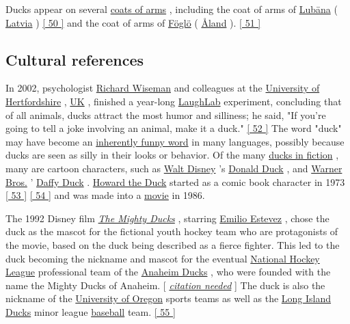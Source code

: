 \documentclass[11pt,a4paper]{article}
\begin{document}
Ducks appear on several \href{/wiki/Coats\_of\_arms}{coats of arms} , including the coat of arms of \href{/wiki/Lub\%C4\%81na}{Lubāna} ( \href{/wiki/Latvia}{Latvia} ) \href{\#cite\_note-50}{[ 50 ]} and the coat of arms of \href{/wiki/F\%C3\%B6gl\%C3\%B6}{Föglö} ( \href{/wiki/\%C3\%85land}{Åland} ). \href{\#cite\_note-51}{[ 51 ]}

\subsection{Cultural references}

In 2002, psychologist \href{/wiki/Richard\_Wiseman}{Richard Wiseman} and colleagues at the \href{/wiki/University\_of\_Hertfordshire}{University of Hertfordshire} , \href{/wiki/UK}{UK} , finished a year-long \href{/wiki/LaughLab}{LaughLab} experiment, concluding that of all animals, ducks attract the most humor and silliness; he said, "If you're going to tell a joke involving an animal, make it a duck." \href{\#cite\_note-52}{[ 52 ]} The word "duck" may have become an \href{/wiki/Inherently\_funny\_word}{inherently funny word} in many languages, possibly because ducks are seen as silly in their looks or behavior. Of the many \href{/wiki/List\_of\_fictional\_ducks}{ducks in fiction} , many are cartoon characters, such as \href{/wiki/The\_Walt\_Disney\_Company}{Walt Disney} 's \href{/wiki/Donald\_Duck}{Donald Duck} , and \href{/wiki/Warner\_Bros.}{Warner Bros.} ' \href{/wiki/Daffy\_Duck}{Daffy Duck} . \href{/wiki/Howard\_the\_Duck}{Howard the Duck} started as a comic book character in 1973 \href{\#cite\_note-53}{[ 53 ]} \href{\#cite\_note-54}{[ 54 ]} and was made into a \href{/wiki/Howard\_the\_Duck\_\%28film\%29}{movie} in 1986.

The 1992 Disney film \href{/wiki/The\_Mighty\_Ducks\_\%28film\%29}{\textit{The Mighty Ducks}} , starring \href{/wiki/Emilio\_Estevez}{Emilio Estevez} , chose the duck as the mascot for the fictional youth hockey team who are protagonists of the movie, based on the duck being described as a fierce fighter. This led to the duck becoming the nickname and mascot for the eventual \href{/wiki/National\_Hockey\_League}{National Hockey League} professional team of the \href{/wiki/Anaheim\_Ducks}{Anaheim Ducks} , who were founded with the name the Mighty Ducks of Anaheim. [ \href{/wiki/Wikipedia:Citation\_needed}{\textit{citation needed}} ] The duck is also the nickname of the \href{/wiki/University\_of\_Oregon}{University of Oregon} sports teams as well as the \href{/wiki/Long\_Island\_Ducks}{Long Island Ducks} minor league \href{/wiki/Baseball}{baseball} team. \href{\#cite\_note-55}{[ 55 ]}
\end{document}
